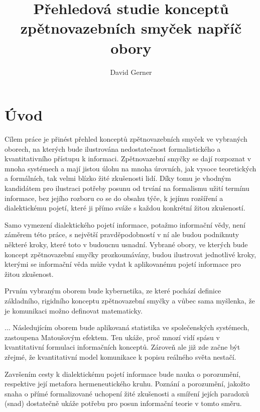 \documentclass[11pt,a4paper]{article}
\author{David Gerner}
\title{Přehledová studie konceptů zpětnovazebních smyček napříč obory}
\begin{document}
\begin{titlepage}
\maketitle
\end{titlepage}

\tableofcontents
\pagebreak

\section*{Úvod}

Cílem práce je přinést přehled konceptů zpětnovazebních smyček ve vybraných oborech, na kterých bude ilustrována nedostatečnost formalistického a kvantitativního přístupu k informaci. Zpětnovazební smyčky se dají rozpoznat v mnoha systémech a mají jistou úlohu na mnoha úrovních, jak vysoce teoretických a formálních, tak velmi blízko žité zkušenosti lidí. Díky tomu je vhodným kandidátem pro ilustraci potřeby posunu od trvání na formalismu užití termínu informace, bez jejího rozboru co se do obsahu týče, k jejímu rozšíření a dialektickému pojetí, které ji přímo sváže s každou konkrétní žitou zkušeností. 

Samo vymezení dialektického pojetí informace, potažmo informační vědy, není záměrem této práce, s největší pravděpodobností v ní ale budou podniknuty některé kroky, které toto v budoucnu usnadní. Vybrané obory, ve kterých bude koncept zpětnovazební smyčky prozkoumávány, budou ilustrovat jednotlivé kroky, kterými se informační věda může vydat k aplikovanému pojetí informace pro žitou zkušenost.

Prvním vybraným oborem bude kybernetika, ze které pochází definice základního, rigidního konceptu zpětnovazební smyčky a vůbec sama myšlenka, že je komunikaci možno definovat matematicky.

... Následujícím oborem bude aplikovaná statistika ve společenských systémech, zastoupena Matoušovým efektem. Ten ukáže, proč mnozí vidí spásu v kvantitativní formulaci informačních konceptů. Zároveň ale již zde začne být zřejmé, že kvantitativní model komunikace k popisu reálného světa nestačí.

Završením cesty k dialektickému pojetí informace bude nauka o porozumění, respektive její metafora hermeneutického kruhu. Poznání a porozumění, jakožto snaha o přímé formalizované uchopení žité zkušenosti a smíření jejích paradoxů (snad) dostatečně ukáže potřebu pro posun informační teorie v tomto směru.
\end{document}
